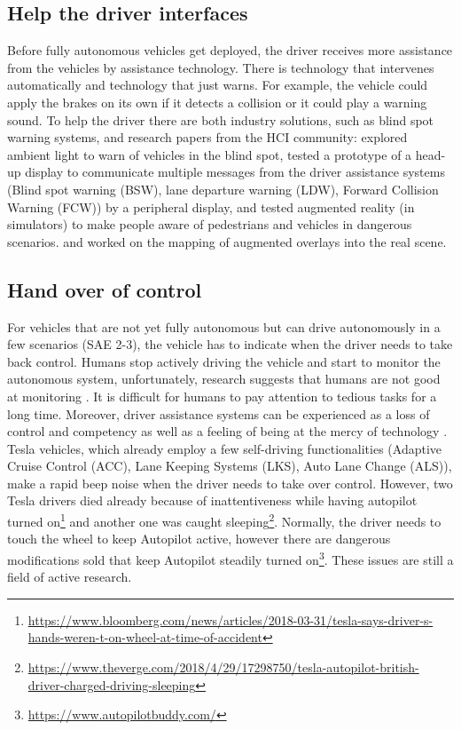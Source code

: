 \subsection{Help the driver interfaces}
Before fully autonomous vehicles get deployed, the driver receives more assistance from the vehicles by assistance technology. There is technology that intervenes automatically and technology that just warns. For example, the vehicle could apply the brakes on its own if it detects a collision or it could play a warning sound. To help the driver there are both industry solutions, such as blind spot warning systems, and research papers from the HCI community:  \citet{Loecken2015} explored ambient light to warn of vehicles in the blind spot, \citet{Langlois2013} tested a prototype of a head-up display to communicate multiple messages from the driver assistance systems (Blind spot warning (BSW), lane departure warning (LDW), Forward Collision Warning (FCW)) by a peripheral display, \citet{Kim} and \citet{Langlois2016} tested augmented reality (in simulators) to make people aware of pedestrians and vehicles in dangerous scenarios. 
\citet{Larnaout2013} and \citet{Abdi} worked on the mapping of augmented overlays into the real scene. 

\subsection{Hand over of control}
For vehicles that are not yet fully autonomous but can drive autonomously in a few scenarios (SAE 2-3), the vehicle has to indicate when the driver needs to take back control. Humans stop actively driving the vehicle and start to monitor the autonomous system, unfortunately, research suggests that humans are not good at monitoring \citep{Naujoks2014TheConditions.}. It is difficult for humans to pay attention to tedious tasks for a long time. Moreover, driver assistance systems can be experienced as a loss of control and competency as well as a feeling of being at the mercy of technology \citep{Eckoldt2012AnSystems}. Tesla vehicles, which already employ a few self-driving functionalities (Adaptive Cruise Control (ACC), Lane Keeping Systems (LKS), Auto Lane Change (ALS)), make a rapid beep noise when the driver needs to take over control. However, two Tesla drivers died already because of inattentiveness while having autopilot turned on\footnote{\url{https://www.bloomberg.com/news/articles/2018-03-31/tesla-says-driver-s-hands-weren-t-on-wheel-at-time-of-accident}} and another one was caught sleeping\footnote{\url{https://www.theverge.com/2018/4/29/17298750/tesla-autopilot-british-driver-charged-driving-sleeping}}. Normally, the driver needs to touch the wheel to keep Autopilot active, however there are dangerous modifications sold that keep Autopilot steadily turned on\footnote{\url{https://www.autopilotbuddy.com/}}. These issues are still a field of active research.

